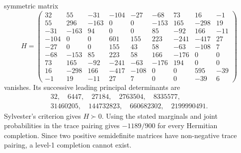 symmetric matrix
\[
H=\begin{pmatrix}
32 & 55 & -31 & -104 & -27 & -68 & 73 & 16 & -1\\
55 & 296 & -163 & 0 & 0 & -153 & 165 & -298 & 19\\
-31 & -163 & 94 & 0 & 0 & 85 & -92 & 166 & -11\\
-104 & 0 & 0 & 601 & 155 & 223 & -241 & -417 & 27\\
-27 & 0 & 0 & 155 & 43 & 58 & -63 & -108 & 7\\
-68 & -153 & 85 & 223 & 58 & 166 & -176 & 0 & 0\\
73 & 165 & -92 & -241 & -63 & -176 & 194 & 0 & 0\\
16 & -298 & 166 & -417 & -108 & 0 & 0 & 595 & -39\\
-1 & 19 & -11 & 27 & 7 & 0 & 0 & -39 & 6
\end{pmatrix}
\]
vanishes. Its successive leading principal determinants are
\[
\begin{gathered}
32,\quad 6447,\quad 27184,\quad 2763504,\quad 8335577,\\
31460205,\quad 144732823,\quad 660682302,\quad 2199990491 .
\end{gathered}
\]
Sylvester's criterion gives $H\succ0$. Using the stated marginals and joint probabilities
in the trace pairing gives $-1189/900$ for every Hermitian completion. Since two positive
semidefinite matrices have non-negative trace pairing, a level-1 completion cannot exist.
